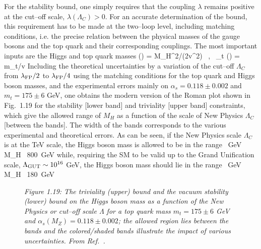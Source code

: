 For the stability bound, one simply requires  that the coupling $\lambda$
remains positive at the cut--off scale, $\lambda(\Lambda_C)>0$. For an accurate
determination of the bound,  this requirement has to be made at the two--loop
level, including matching conditions, i.e. the precise relation between the
physical masses of the gauge bosons and the top quark and their corresponding 
couplings. The most important inputs are the Higgs and top quark masses
\beq
\lambda(\mu) = M_H^2/(2v^2) \times [1+ \delta_H (\mu) ] \ , \ 
\lambda_t (\mu) =  m_t/v \times [1+ \delta_t (\mu)]
\eeq
Including the theoretical uncertainties by a variation of the cut--off
$\Lambda_C$ from $\lambda_{\rm FP}/2$ to  $\lambda_{\rm FP}/4$ using 
the  matching conditions for the top quark and Higgs boson masses, and the 
experimental errors mainly on $\alpha_s=0.118 \pm 0.002$ and $m_t =175\pm 6$
GeV, one obtains \cite{Riesselman} the modern version of the Roman plot shown
in Fig.~1.19  for the  stability [lower band] and triviality [upper band]
constraints, which give the  allowed range of $M_H$ as a function of the scale
of New Physics $\Lambda_C$ [between the bands]. The width of the bands 
corresponds
to the various experimental and theoretical errors.  As can be seen, if the New
Physics scale $\Lambda_C$ is at the TeV scale, the Higgs boson mass is allowed
to be in the range
~{\rm GeV}~ \lsim M_H \lsim ~800~{\rm GeV}  
\eeq 
while, requiring the SM to be valid up to the Grand Unification scale, 
$\Lambda_{\rm GUT} \sim 10^{16}$ GeV, the Higgs boson mass should lie in the 
range   
~{\rm GeV}~ \lsim M_H \lsim ~180~{\rm GeV}  
\eeq 


\begin{figure}[htbp]
\begin{center}
\vspace*{-4.mm}
\end{center}
\vspace*{2mm}
{\it Figure 1.19: The triviality (upper) bound and the vacuum stability (lower)
bound on the Higgs boson mass as a function of the New Physics or cut--off 
scale $\Lambda$ for a top quark mass $m_t=175 \pm 6$ GeV and $\alpha_s (M_Z)
=0.118 \pm 0.002$; the allowed region lies between the bands and the 
colored/shaded bands illustrate the impact of various uncertainties. From 
Ref.~\cite{Riesselman}.} 
\end{figure} 

